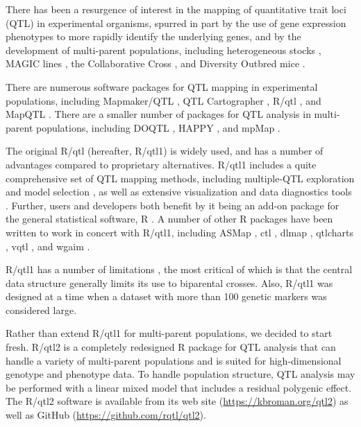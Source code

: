 \documentclass[12pt,letterpaper]{article}
\begin{document}
There has been a resurgence of interest in the mapping of quantitative
trait loci (QTL) in experimental organisms, spurred in part by the use
of gene expression phenotypes \citep[eQTL mapping; see][]{albert2015}
to more rapidly identify the underlying genes, and by the development
of multi-parent populations, including heterogeneous
stocks \citep{mott2000,mott2002}, MAGIC lines \citep{cavanagh2008, kover2009}, the Collaborative
Cross \citep{churchill2004}, and Diversity Outbred mice
\citep{churchill2012, svenson2012}.

There are numerous software packages for QTL mapping in experimental
populations, including Mapmaker/QTL \citep{lincoln1990}, QTL
Cartographer \citep{Basten2002}, R/qtl \citep{broman2003,
  broman_sen}, and MapQTL \citep{mapqtl}.
There are a smaller number of packages for QTL analysis in
multi-parent populations, including DOQTL \citep{gatti2014}, HAPPY
\citep{mott2000}, and mpMap \citep{mpMap}.

The original R/qtl (hereafter, R/qtl1) is widely used, and has a number of
advantages compared to proprietary alternatives. R/qtl1 includes a quite comprehensive set of QTL mapping
methods, including multiple-QTL exploration and model selection \citep{MQMpaper,broman2002,manichaikul2009}, as
well as extensive visualization
and data diagnostics tools \citep{broman_sen}. Further, users and developers both benefit by it
being an add-on package for the general statistical software, R
\citep{RCore}. A number of other R packages have been written to work in
concert with R/qtl1, including ASMap \citep{ASMap}, ctl \citep{ctl},
dlmap \citep{dlmap}, qtlcharts \citep{qtlcharts}, vqtl \citep{vqtl}, and
wgaim \citep{wgaim}.

R/qtl1 has a number of limitations
\citep[see][]{broman2014}, the most critical of which is that the
central data structure generally limits its use to biparental crosses.
Also, R/qtl1 was designed at a time when a dataset with more than 100 genetic
markers was considered large.

Rather than extend R/qtl1 for multi-parent populations, we decided to
start fresh. R/qtl2 is a completely redesigned R package for QTL
analysis that can handle a variety of multi-parent populations and is
suited for high-dimensional genotype and phenotype data. To
handle population structure, QTL analysis may be performed with a
linear mixed model that includes a residual polygenic effect. The
R/qtl2 software is available from its web site
(\url{https://kbroman.org/qtl2}) as well as GitHub
(\url{https://github.com/rqtl/qtl2}).
\end{document}
